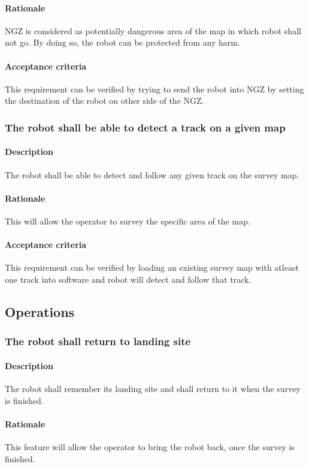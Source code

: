\documentclass[10pt,a4paper,titlepage]{article}
\begin{document}
    \paragraph{Rationale}   NGZ is considered as potentially dangerous area of the map in which robot shall not go. By doing so, the robot can be protected from any harm.
    \paragraph{Acceptance criteria}   This requirement can be verified by trying to send the robot into NGZ by setting the destination of the robot on other side of the NGZ.
    \subsubsection{The robot shall be able to detect a track on a given map}
     \paragraph{Description}   The robot shall be able to detect and follow any given track on the survey map.
    \paragraph{Rationale}   This will allow the operator to survey the specific area of the map.
    \paragraph{Acceptance criteria}   This requirement can be verified by loading an existing survey map with atleast one track into software and robot will detect and follow that track.
	\subsection{Operations}
    \subsubsection{The robot shall return to landing site}
     \paragraph{Description}   The robot shall remember its landing site and shall return to it when the survey is finished.
    \paragraph{Rationale}   This feature will allow the operator to bring the robot back, once the survey is finished.
\end{document}
